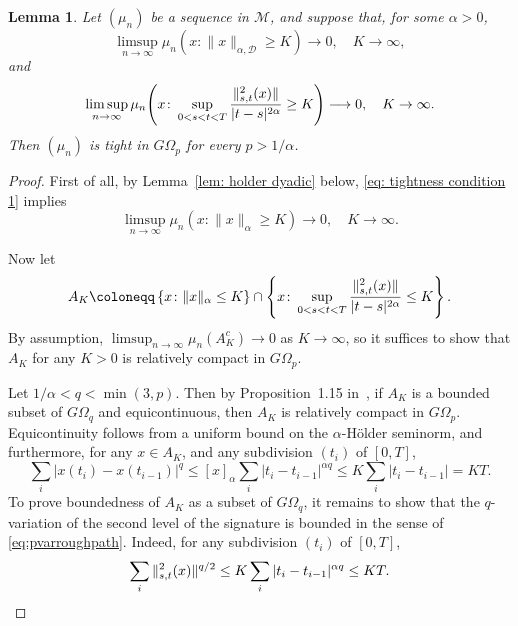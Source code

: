 \documentclass[11pt, letterpaper]{article}
\let\sig\relax
\DeclareMathOperator{\sig}{S}
\newtheorem{lemma}{Lemma}
\theoremstyle{definition}
\theoremstyle{remark}
\begin{document}
\begin{appendices}
\begin{lemma}\label{lem:tightness}
    Let $(\mu_n)$ be a sequence in $\mathcal{M}$, and suppose that, for some $\alpha > 0$,
    \begin{equation}\label{eq: tightness condition 1}
    \limsup_{n\to \infty} \mu_n(x\colon \|x\|_{\alpha,\mathcal{D}} \ge K) \longrightarrow 0,\quad K \to \infty,
    \end{equation}
    and 
    \begin{equation}\label{eq: tightness condition 2}
    \limsup_{n\to \infty} \mu_n\Bigg(x\colon \sup_{0 < s < t < T} \frac{\| \sig^2_{s,t}(x) \|}{|t-s|^{2\alpha}} \ge K\Bigg) \longrightarrow 0,\quad K \to \infty.
    \end{equation}
    Then $(\mu_n)$ is tight in $G\Omega_p$ for every $p > 1 / \alpha$.
\end{lemma}
\begin{proof}
    First of all, by Lemma~\ref{lem: holder dyadic} below, \eqref{eq: tightness condition 1} implies \[
        \limsup_{n\to \infty} \mu_n(x\colon \|x\|_{\alpha} \ge K) \longrightarrow 0,\quad K \to \infty.
    \]
    
    Now let \[
    A_K \coloneqq \left\{ x\colon \|x\|_\alpha \le K\right\} \cap \left\{x\colon \sup_{0 < s < t < T} \frac{\| \sig^2_{s,t}(x) \|}{|t-s|^{2\alpha}} \le K\right\}.
    \] By assumption, $\limsup_{n\to \infty}\mu_n(A_K^{c}) \to 0$ as $K\to \infty$, so it suffices to show that $A_K$ for any $K > 0$ is relatively compact in $G\Omega_p$.
    
    Let $1 / \alpha < q < \min(3,p)$.
    Then by Proposition~1.15 in~\cite{terrystflour}, if $A_K$ is a bounded subset of $G\Omega_q$ and equicontinuous, then $A_K$ is relatively compact in $G\Omega_p$. Equicontinuity follows from a uniform bound on the $\alpha$-H\"older seminorm, and furthermore, for any $x\in A_K$, and any subdivision $(t_i)$ of $[0,T]$, \[
    \sum_i |x(t_i) - x(t_{i-1})|^{q} \le [x]_\alpha \sum_i |t_i - t_{i-1}|^{\alpha q} \le K\sum_i |t_i - t_{i-1}| = KT.
    \] To prove boundedness of $A_K$ as a subset of $G\Omega_q$, it remains to show that the $q$-variation of the second level of the signature is bounded in the sense of \eqref{eq:pvarroughpath}. Indeed, for any subdivision $(t_i)$ of $[0,T]$, \[
    \sum_i \|\sig ^2_{s,t}(x)\|^{q/2} \le K \sum_i |t_i- t_{i-1}|^{\alpha q} \le K T.
    \]
\end{proof}



\end{appendices}
\end{document}
